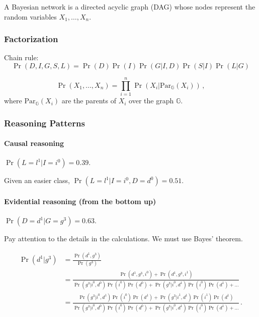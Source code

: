 \documentclass[12pt]{article}
\begin{document}
A Bayesian network is a directed acyclic graph (DAG) whose nodes represent the random variables $X_1, \ldots, X_n$.
\subsubsection{Factorization}
Chain rule:
\begin{equation}
  \Pr(D, I, G, S, L) = \Pr(D) \Pr(I) \Pr(G|I, D) \Pr(S|I) \Pr(L|G)
\end{equation}

\begin{equation}
  \Pr(X_1, ..., X_n) = \prod_{i=1}^n \Pr(X_i | \text{Par}_\mathbb{G}( X_i ) ) \, ,
\end{equation}
where $\text{Par}_\mathbb{G}( X_i )$ are the parents of $X_i$ over the graph $\mathbb{G}$.


\subsubsection{Reasoning Patterns}
\paragraph{Causal reasoning}
$\Pr(L = l^1 | I = i^0) = 0.39$.

Given an easier class, $\Pr(L = l^1 | I = i^0, D = d^0) = 0.51$.

\paragraph{Evidential reasoning (from the bottom up)}
$\Pr(D = d^1 | G = g^3) = 0.63$.

Pay attention to the details in the calculations. We must use Bayes' theorem.

\begin{align*}
\Pr(d^1 | g^3) & = \frac{\Pr(d^1, g^3)}
                      {\Pr(g^3)} \\
               & = \frac{\Pr(d^1, g^3, i^0) + \Pr(d^1, g^3, i^1)}
                        {\Pr(g^3 | i^0, d^0) \Pr(i^0) \Pr(d^0) + \Pr(g^3 | i^0, d^1) \Pr(i^0) \Pr(d^1) + \ldots} \\
               & = \frac{\Pr(g^3 | i^0, d^1) \Pr(i^0) \Pr(d^1) + \Pr(g^3 | i^1, d^1) \Pr(i^1) \Pr(d^1)}
                        {\Pr(g^3 | i^0, d^0) \Pr(i^0) \Pr(d^0) + \Pr(g^3 | i^0, d^1) \Pr(i^0) \Pr(d^1) + \ldots} \, .
\end{align*}
\end{document}
